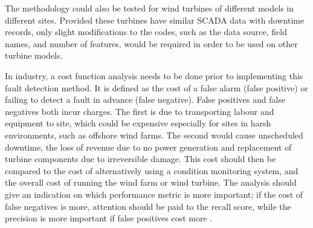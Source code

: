 The methodology could also be tested for wind turbines of different models in
different sites. Provided these turbines have similar SCADA data with downtime
records, only slight modifications to the codes, such as the data source,
field names, and number of features, would be required in order to be used on
other turbine models.

In industry, a cost function analysis needs to be done prior to implementing
this fault detection method. It is defined as the cost of a false alarm (false
positive) or failing to detect a fault in advance (false negative). False
positives and false negatives both incur charges. The first is due to
transporting labour and equipment to site, which could be expensive especially
for sites in harsh environments, such as offshore wind farms. The second would
cause unscheduled downtime, the loss of revenue due to no power generation and
replacement of turbine components due to irreversible damage. This cost should
then be compared to the cost of alternatively using a condition monitoring
system, and the overall cost of running the wind farm or wind turbine. The
analysis should give an indication on which performance metric is more
important; if the cost of false negatives is more, attention should be paid to
the recall score, while the precision is more important if false positives
cost more \cite{deRu15}.
